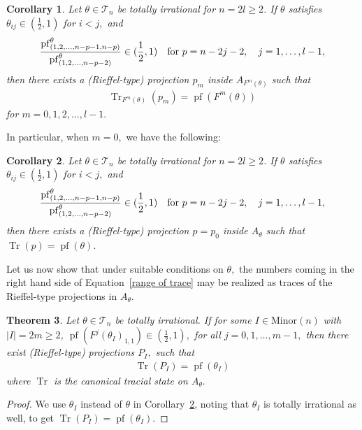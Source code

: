 \documentclass[9pt, BCOR=2mm]{amsart}
\numberwithin{equation}{section}
\numberwithin{equation}{section}
\newtheorem{theorem}{Theorem}[section]
\newtheorem{corollary}[theorem]{Corollary}
\newcommand{\pf}{{\operatorname{pf}}}
\DeclareMathOperator{\Tr}{Tr}
\newcommand{\m}[2]{\ensuremath{{#1}_{#2}}}
\begin{document}
 \begin{corollary}\label{even n projection explicit}
  Let $\theta\in \mathcal{T}_n$ be totally irrational for $n=2l\geq2$. If $\theta$ satisfies 
  $\theta_{ij} \in (\frac{1}{2},1)$ for $i<j,$ and  \begin{eqnarray}\frac{{\pf}^{\theta}_{(1,2,\dots,n-p-1,n-p)}}{{\pf}^{\theta}_{(1,2,\dots,n-p-2)}}\in (\frac{1}{2},1)\quad {\rm for}\,\, p=n-2j-2,\quad j=1,\dots,l-1,
\end{eqnarray}  then
  there exists a (Rieffel-type) projection $p_m$ inside $A_{F^m(\theta)}$ such that
  \begin{eqnarray}\Tr_{F^m(\theta)}(p_m)={\pf}(F^m(\theta))\nonumber
   \end{eqnarray}
   for $m=0,1,2,\dots,l-1.$
\end{corollary}

In particular, when $m=0,$ we have the following:

 \begin{corollary}\label{even n projection explicit_m=0}
Let $\theta\in \mathcal{T}_n$ be totally irrational for $n=2l\geq2$. If $\theta$ satisfies $\theta_{ij} \in (\frac{1}{2},1)$ for $i<j,$ and \begin{eqnarray}\frac{{\pf}^{\theta}_{(1,2,\dots,n-p-1,n-p)}}{{\pf}^{\theta}_{(1,2,\dots,n-p-2)}}\in (\frac{1}{2},1)\quad {\rm for}\,\, p=n-2j-2,\quad j=1,\dots,l-1,
\end{eqnarray}  then
  there exists a (Rieffel-type) projection $p=p_0$ inside $A_{\theta}$ such that
$\Tr(p)={\pf}(\theta).$
  
\end{corollary}



 Let us now show that under suitable conditions on $\theta,$ the numbers coming in the right hand side of Equation~\ref{range of trace} may be realized as traces of the Rieffel-type projections in $A_\theta.$
\begin{theorem}\label{PI1}
Let $\theta\in \mathcal{T}_n$ be totally irrational. If for some $I \in \mathrm{Minor}(n)$ with $|I|=2m\geq 2$, 
$ {\pf}(F^{j}(\theta_I)_{1,1})\in (\frac{1}{2},1),
$
 for all $j=0,1,\dots,m-1,$
  then there exist  (Rieffel-type) projections $P_{I},$ such that
  \begin{eqnarray}\label{pI1}\Tr(P_{I})={\pf}(\m{\theta}{I})
  \end{eqnarray}
where $\Tr$ is the canonical tracial state on $A_{\theta}.$
\end{theorem}
\begin{proof}
  We use $\m{\theta}{I}$ instead of $\theta$ in Corollary~\ref{even n projection explicit_m=0}, noting that $\m{\theta}{I}$ is totally irrational as well, to get $\Tr(P_{I})={\pf}(\m{\theta}{I}).$
\end{proof}
\end{document}
